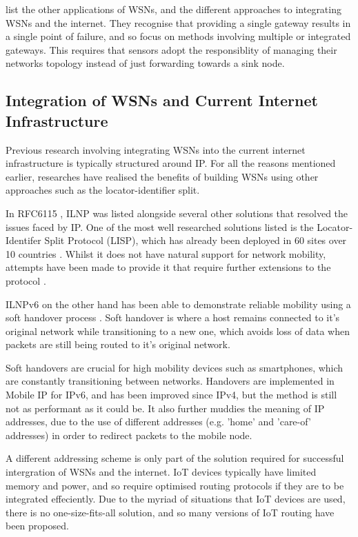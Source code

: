 \documentclass[12pt]{article}
\begin{document}
\cite{wsnlist} list the other applications of WSNs, and the different approaches to integrating WSNs and the internet. They recognise that providing a single gateway results in a single point of failure, and so focus on methods involving multiple or integrated gateways. This requires that sensors adopt the responsiblity of managing their networks topology instead of just forwarding towards a sink node. 

\subsection{Integration of WSNs and Current Internet Infrastructure}

Previous research involving integrating WSNs into the current internet infrastructure is typically structured around IP. For all the reasons mentioned earlier, researches have realised the benefits of building WSNs using other approaches such as the locator-identifier split.

In RFC6115 \cite{rfc6115}, ILNP was listed alongside several other solutions that resolved the issues faced by IP. One of the most well researched solutions listed is the Locator-Identifer Split Protocol (LISP), which has already been deployed in 60 sites over 10 countries \cite{nahla}. Whilst it does not have natural support for network mobility, attempts have been made to provide it that require further extensions to the protocol \cite{moblisp}. 

ILNPv6 on the other hand has been able to demonstrate reliable mobility using a soft handover process \cite{shilnp}. Soft handover is where a host remains connected to it's original network while transitioning to a new one, which avoids loss of data when packets are still being routed to it's original network. 

Soft handovers are crucial for high mobility devices such as smartphones, which are constantly transitioning between networks. Handovers are implemented in Mobile IP for IPv6, and has been improved since IPv4, but the method is still not as performant as it could be. It also further muddies the meaning of IP addresses, due to the use of different addresses (e.g. 'home' and 'care-of' addresses) in order to redirect packets to the mobile node. 

A different addressing scheme is only part of the solution required for successful intergration of WSNs and the internet. IoT devices typically have limited memory and power, and so require optimised routing protocols if they are to be integrated effeciently. Due to the myriad of situations that IoT devices are used, there is no one-size-fits-all solution, and so many versions of IoT routing have been proposed.
\end{document}

